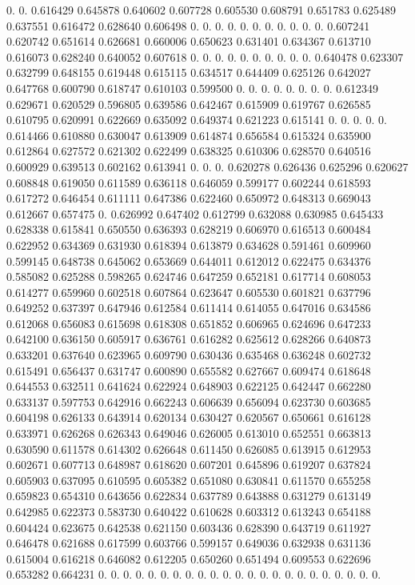 0.  0.  0.616429   0.645878   0.640602   0.607728   0.605530   0.608791   0.651783   0.625489   0.637551   0.616472   0.628640   0.606498   0.  0.  0.  0.  0.  0.  0.  0.  0.  
0.  0.  0.607241   0.620742   0.651614   0.626681   0.660006   0.650623   0.631401   0.634367   0.613710   0.616073   0.628240   0.640052   0.607618   0.  0.  0.  0.  0.  0.  0.  0.  
0.  0.  0.640478   0.623307   0.632799   0.648155   0.619448   0.615115   0.634517   0.644409   0.625126   0.642027   0.647768   0.600790   0.618747   0.610103   0.599500   0.  0.  0.  0.  0.  0.  
0.  0.  0.612349   0.629671   0.620529   0.596805   0.639586   0.642467   0.615909   0.619767   0.626585   0.610795   0.620991   0.622669   0.635092   0.649374   0.621223   0.615141   0.  0.  0.  0.  0.  
0.614466   0.610880   0.630047   0.613909   0.614874   0.656584   0.615324   0.635900   0.612864   0.627572   0.621302   0.622499   0.638325   0.610306   0.628570   0.640516   0.600929   0.639513   0.602162   0.613941   0.  0.  0.  
0.620278   0.626436   0.625296   0.620627   0.608848   0.619050   0.611589   0.636118   0.646059   0.599177   0.602244   0.618593   0.617272   0.646454   0.611111   0.647386   0.622460   0.650972   0.648313   0.669043   0.612667   0.657475   0.  
0.626992   0.647402   0.612799   0.632088   0.630985   0.645433   0.628338   0.615841   0.650550   0.636393   0.628219   0.606970   0.616513   0.600484   0.622952   0.634369   0.631930   0.618394   0.613879   0.634628   0.591461   0.609960   0.599145   
0.648738   0.645062   0.653669   0.644011   0.612012   0.622475   0.634376   0.585082   0.625288   0.598265   0.624746   0.647259   0.652181   0.617714   0.608053   0.614277   0.659960   0.602518   0.607864   0.623647   0.605530   0.601821   0.637796   
0.649252   0.637397   0.647946   0.612584   0.611414   0.614055   0.647016   0.634586   0.612068   0.656083   0.615698   0.618308   0.651852   0.606965   0.624696   0.647233   0.642100   0.636150   0.605917   0.636761   0.616282   0.625612   0.628266   
0.640873   0.633201   0.637640   0.623965   0.609790   0.630436   0.635468   0.636248   0.602732   0.615491   0.656437   0.631747   0.600890   0.655582   0.627667   0.609474   0.618648   0.644553   0.632511   0.641624   0.622924   0.648903   0.622125   
0.642447   0.662280   0.633137   0.597753   0.642916   0.662243   0.606639   0.656094   0.623730   0.603685   0.604198   0.626133   0.643914   0.620134   0.630427   0.620567   0.650661   0.616128   0.633971   0.626268   0.626343   0.649046   0.626005   
0.613010   0.652551   0.663813   0.630590   0.611578   0.614302   0.626648   0.611450   0.626085   0.613915   0.612953   0.602671   0.607713   0.648987   0.618620   0.607201   0.645896   0.619207   0.637824   0.605903   0.637095   0.610595   0.605382   
0.651080   0.630841   0.611570   0.655258   0.659823   0.654310   0.643656   0.622834   0.637789   0.643888   0.631279   0.613149   0.642985   0.622373   0.583730   0.640422   0.610628   0.603312   0.613243   0.654188   0.604424   0.623675   0.642538   
0.621150   0.603436   0.628390   0.643719   0.611927   0.646478   0.621688   0.617599   0.603766   0.599157   0.649036   0.632938   0.631136   0.615004   0.616218   0.646082   0.612205   0.650260   0.651494   0.609553   0.622696   0.653282   0.664231   
0.  0.  0.  0.  0.  0.  0.  0.  0.  0.  0.  0.  0.  0.  0.  0.  0.  0.  0.  0.  0.  0.  0.  
